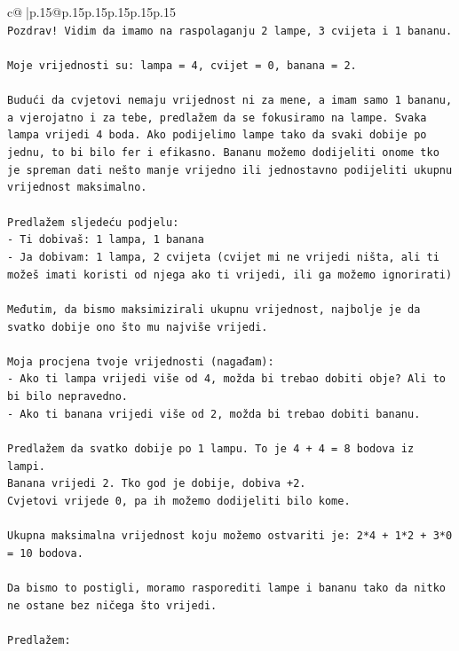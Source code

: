 \documentclass{article}
\begin{document}
{\begin{supertabular}{c@{$\;$}|p{.15\linewidth}@{}p{.15\linewidth}p{.15\linewidth}p{.15\linewidth}p{.15\linewidth}p{.15\linewidth}}
{{{\\ 
\texttt{Pozdrav! Vidim da imamo na raspolaganju 2 lampe, 3 cvijeta i 1 bananu.} \\
\\ 
\texttt{Moje vrijednosti su: lampa = 4, cvijet = 0, banana = 2.} \\
\\ 
\texttt{Budući da cvjetovi nemaju vrijednost ni za mene, a imam samo 1 bananu, a vjerojatno i za tebe, predlažem da se fokusiramo na lampe. Svaka lampa vrijedi 4 boda. Ako podijelimo lampe tako da svaki dobije po jednu, to bi bilo fer i efikasno. Bananu možemo dodijeliti onome tko je spreman dati nešto manje vrijedno ili jednostavno podijeliti ukupnu vrijednost maksimalno.} \\
\\ 
\texttt{Predlažem sljedeću podjelu:} \\
\texttt{{-} Ti dobivaš: 1 lampa, 1 banana} \\
\texttt{{-} Ja dobivam: 1 lampa, 2 cvijeta (cvijet mi ne vrijedi ništa, ali ti možeš imati koristi od njega ako ti vrijedi, ili ga možemo ignorirati)} \\
\\ 
\texttt{Međutim, da bismo maksimizirali ukupnu vrijednost, najbolje je da svatko dobije ono što mu najviše vrijedi.} \\
\\ 
\texttt{Moja procjena tvoje vrijednosti (nagađam):} \\
\texttt{{-} Ako ti lampa vrijedi više od 4, možda bi trebao dobiti obje? Ali to bi bilo nepravedno.} \\
\texttt{{-} Ako ti banana vrijedi više od 2, možda bi trebao dobiti bananu.} \\
\\ 
\texttt{Predlažem da svatko dobije po 1 lampu. To je 4 + 4 = 8 bodova iz lampi.} \\
\texttt{Banana vrijedi 2. Tko god je dobije, dobiva +2.} \\
\texttt{Cvjetovi vrijede 0, pa ih možemo dodijeliti bilo kome.} \\
\\ 
\texttt{Ukupna maksimalna vrijednost koju možemo ostvariti je: 2*4 + 1*2 + 3*0 = 10 bodova.} \\
\\ 
\texttt{Da bismo to postigli, moramo rasporediti lampe i bananu tako da nitko ne ostane bez ničega što vrijedi.} \\
\\ 
\texttt{Predlažem:} \\
}}}
\end{supertabular}}
\end{document}
